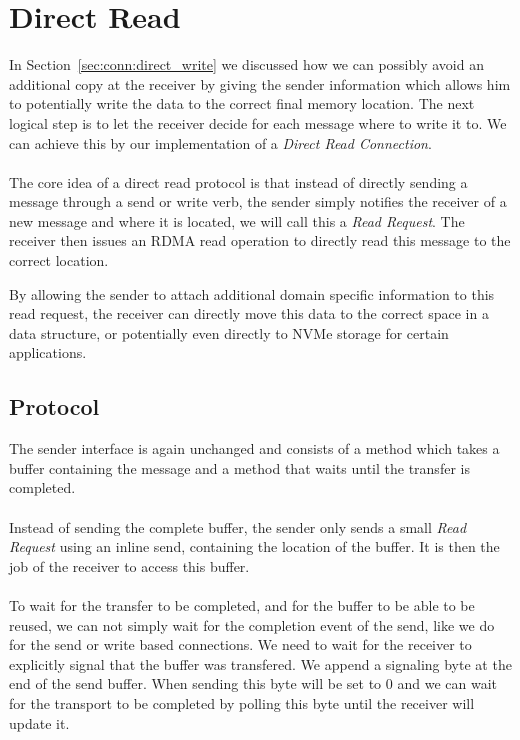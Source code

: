 
\section{Direct Read} \label{sec:conn:direct_read}

In Section~\ref{sec:conn:direct_write} we discussed how we can possibly avoid an additional copy at the receiver by giving 
the sender information which allows him to potentially write the data to the correct final memory location. The next logical
step is to let the receiver decide for each message where to write it to. We can achieve this by our implementation of a
\emph{Direct Read Connection}.

\paragraph{} The core idea of a direct read protocol is that instead of directly sending a message through a send or write 
verb, the sender simply notifies the receiver of a new message and where it is located, we will call this a \emph{Read Request}.
The receiver then issues an RDMA read operation to directly read this message to the correct location.

By allowing the sender to attach additional domain specific information to this read request, the receiver can directly 
move this data to the correct space in a data structure, or potentially even directly to NVMe storage for certain applications.


\subsection{Protocol}
The sender interface is again unchanged and consists of a  method which takes a buffer containing the
message and a  method that waits until the transfer is completed.

\paragraph{} Instead of sending the complete buffer, the sender only sends a small \emph{Read Request} using an inline send,
containing the location of the buffer. It is then the job of the receiver to access this buffer.

\paragraph{} To wait for the transfer to be completed, and for the buffer to be able to be reused, we can not simply wait 
for the completion event of the send, like we do for the send or write based connections. We need to wait for the receiver 
to explicitly signal that the buffer was transfered. We append a signaling byte at the end of the send buffer. 
When sending this byte will be set to 0 and we can wait for the transport to be completed by polling this byte until the 
receiver will update it.

